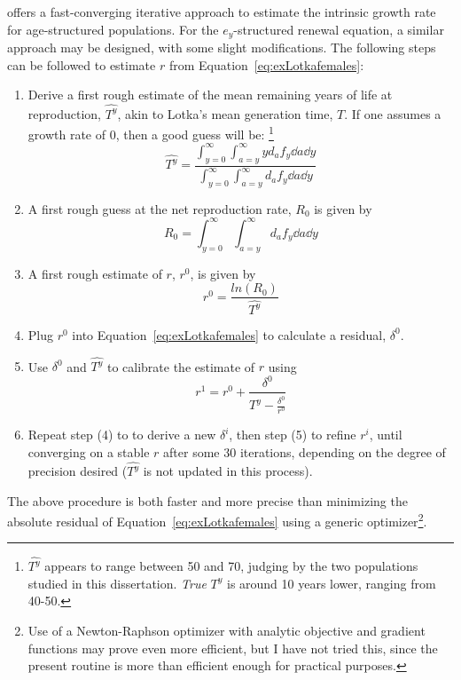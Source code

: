  \FloatBarrier
\label{sec:exrenewalit}
\citet{coale1957new} offers a fast-converging iterative approach to estimate the
intrinsic growth rate for age-structured populations. For the $e_y$-structured
renewal equation, a similar approach may be designed, with some slight
modifications. The following steps can be followed to estimate $r$ from
Equation~\ref{eq:exLotkafemales}:

\begin{enumerate}
  \item Derive a first rough estimate of the mean remaining years of life at
  reproduction, $\widehat{T^y}$, akin to Lotka's mean generation time, $T$. If
  one assumes a growth rate of $0$, then a good guess will be: \footnote{$\widehat{T^y}$ appears to range between 50 and 70, judging by the
 two populations studied in this dissertation. \textit{True} $T^y$ is around 10
 years lower, ranging from 40-50.}
\begin{equation}
\widehat{T^y} = \frac{\int _{y=0}^\infty \int _{a=y}^\infty y d_a f_y \dd a
\dd y}{\int _{y=0}^\infty \int _{a=y}^\infty d_a f_y \dd a \dd y}
\end{equation}
  \item A first rough guess at the net reproduction rate, $R_0$ is given by
 \begin{equation}
  R_0 = \int _{y=0}^\infty \int _{a=y}^\infty d_a f_y \dd a
\dd y
\end{equation}
  \item A first rough estimate of $r$, $r^0$, is given by
   \begin{equation}
   r^0 = \frac{ln(R_0)}{\widehat{T^y}}
   \end{equation}
  \item Plug $r^0$ into Equation~\eqref{eq:exLotkafemales} to calculate a
  residual, $\delta^0$.
  \item Use $\delta^0$ and $\widehat{T^y}$ to calibrate the estimate of $r$
  using
  \begin{equation}
  r^{1} = r^0 + \frac{\delta^0}{\widehat{T^y} - \frac{\delta^0}{r^0}}
  \end{equation}
  \item Repeat step (4) to to derive a new $\delta^i$, then step (5) to refine
  $r^i$, until converging on a stable $r$ after some 30 iterations,
  depending on the degree of precision desired ($\widehat{T^y}$ is not updated
  in this process).
\end{enumerate}

The above procedure is both faster and more precise than minimizing the absolute
residual of Equation~\eqref{eq:exLotkafemales} using a generic
optimizer\footnote{Use of a Newton-Raphson optimizer with analytic objective
and gradient functions may prove even more efficient, but I have not tried
this, since the present routine is more than efficient enough for practical
purposes.}.
